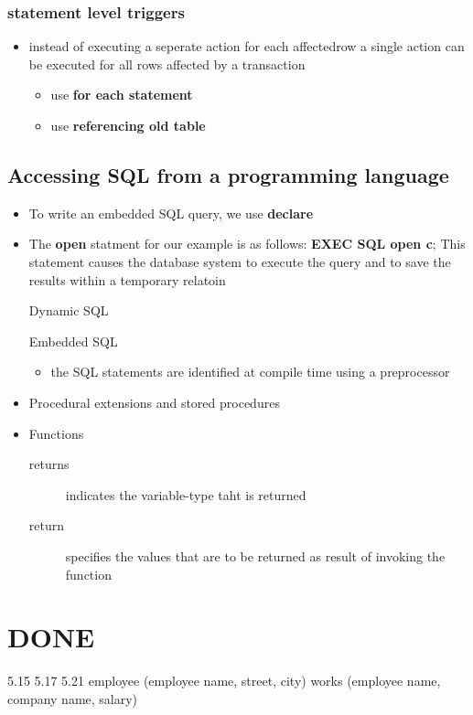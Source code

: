 \documentclass[11pt]{article}
\begin{document}
\subsubsection{statement level triggers}
\label{sec-9-1-3}
\begin{itemize}
\item instead of executing a seperate action for each affectedrow
a single action can be executed for all rows affected by a transaction
\begin{itemize}
\item use \textbf{for each statement}
\item use \textbf{referencing old table}
\end{itemize}
\end{itemize}
\subsection{Accessing SQL from a programming language}
\label{sec-9-2}
\begin{itemize}
\item To write an embedded SQL query, we use
\textbf{declare}
\item The \textbf{open} statment for our example is as follows:
\textbf{EXEC SQL open c};
This statement causes the database system to execute the query
and to save the results within a temporary relatoin
\item[{Dynamic SQL}] 
\item[{Embedded SQL}] \begin{itemize}
\item the SQL statements are identified at compile time using a preprocessor
\end{itemize}
\item Procedural extensions and stored procedures
\item Functions
\begin{description}
\item[{returns}] indicates the variable-type taht is returned
\item[{return}] specifies the values that are to be returned as result of invoking
the function
\end{description}
\end{itemize}
\section{{\bfseries\sffamily DONE} }
\label{sec-10}
  5.15 5.17 5.21
  employee (employee name, street, city)
works (employee name, company name, salary)
\end{document}
